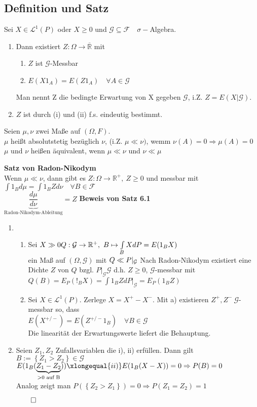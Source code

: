 \documentclass[german,10pt,oneside, fleqn, a4paper]{article}
\newcommand {\R}	{\mathbb{R}}
\newcommand{\Ra}	{\Rightarrow}
\newcommand{\ra}{\rightarrow}
\newcommand{\brac}[1]{\left\lbrace #1\right\rbrace}
\newcommand{\QED}{\begin{flushright}$\qed$\end{flushright}}
\newcommand{\mc}[1]{\mathcal{#1}}
\newcommand{\lp}[1]{\mc{L}^{#1}}
\newcommand{\1}[1]{1_{#1}}
\newcommand{\2}[1]{\1{\brac{#1}}}
\newcommand{\g}{\mc{G}}
\newcommand{\f}{\mc{F}}
\begin{document}
\subsection{Definition und Satz}
\label{6.1}
Sei $X\in\lp{1}(P)$ oder $X\geq0$ und $\g\subseteq\f\quad\sigma-$Algebra.\begin{enumerate}[label=(\alph*)]
\item Dann existiert $Z:\Omega\ra\overline{\R}$ mit \begin{enumerate}[label=(\roman*)]
\item $Z$ ist $\g$-Messbar
\item $E(X1_A)=E(Z1_A)\quad\forall A\in\g$
\end{enumerate}
Man nennt Z die bedingte Erwartung von X gegeben $\g$, i.Z. $Z=E(X|\g)$.
\item $Z$ ist durch (i) und (ii) f.s. eindeutig bestimmt.
\end{enumerate}
Seien $\mu,\nu$ zwei Maße auf $(\Omega,F)$.\\
$\mu$ heißt absolutstetig bezüglich $\nu$, (i.Z. $\mu\ll\nu)$, wemm $\nu(A)=0\Ra\mu(A)=0$\\
$\mu$ und $\nu$ heißen äquivalent, wenn $\mu\ll\nu$ und $\nu\ll\mu$

\textbf{Satz von Radon-Nikodym}\\
\label{Radon}
Wenn $\mu\ll\nu$, dann gibt es $Z:\Omega\ra\R^+,\ Z\geq0$ und messbar mit $\int1_Bd\mu=\int1_BZd\nu\quad\forall B\in\f$\\
\grqq$\underbrace{\dfrac{d\mu}{d\nu}}_{\text{Radon-Nikodym-Ableitung}}$\grqq$=Z$
\textbf{Beweis von Satz 6.1}
\begin{enumerate}[label=(\alph*)]
\item \begin{enumerate}[label=(\roman*)]
\item Sei $X\gg0\\
Q:\g\ra\R^+,\ B\mapsto\int\limits_BXdP=E(1_BX)$\\
ein Maß auf $(\Omega,\g)$ mit $Q\ll P|_{\g}\\ $
Nach Radon-Nikodym existiert eine Dichte $Z$ von $Q$ bzgl. $P|_{\g} \g$ d.h. $Z\geq 0$, $\g$-messbar mit \\
$Q(B)=E_P(!_BX)=\int 1_BZdP|_{\g}=E_P(1_BZ)$
\item Sei $X\in\lp{1}(P)$. Zerlege $X=X^+-X^-$. Mit a) existieren $Z^+,Z^-\ \g$-messbar so, dass\\
$E(X^{+/-})=E(Z^{+/-}1_B)\quad\forall B\in\g$\\
Die linearität der Erwartungswerte liefert die Behauptung.
\end{enumerate}
\item Seien $Z_1,Z_2$ Zufallsvariablen die i), ii) erfüllen. Dann gilt\\
$B:=\brac{Z_1>Z_2}\in\g$\\
$E(1_B(\underbrace{Z_1-Z_2}_{>0\text{ auf B}}))\xlongequal{ii)}E(1_B(X-X))=0\\
\Ra P(B)=0$\\
Analog zeigt man $P(\brac{Z_2>Z_1})=0\Ra P(Z_1=Z_2)=1$\QED
\end{enumerate}
\end{document}
